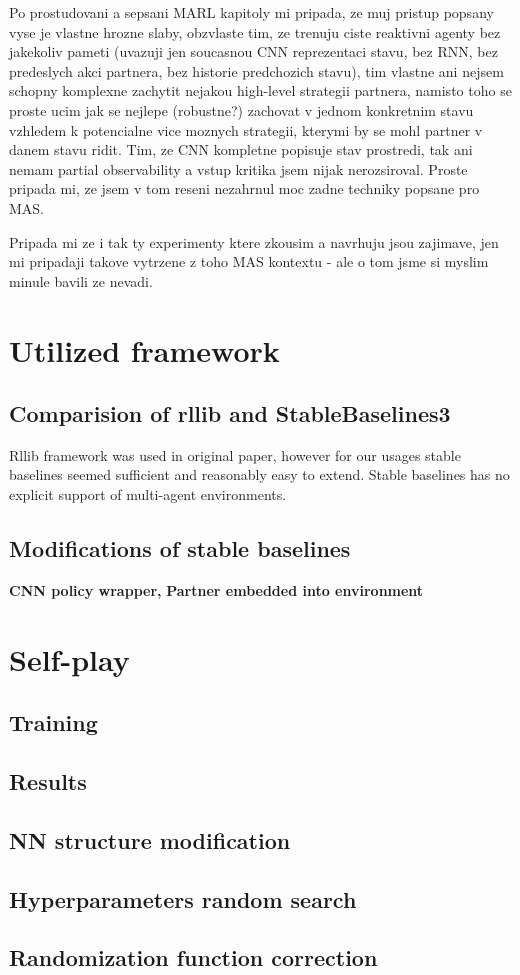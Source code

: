 {\color{blue} Po prostudovani a sepsani MARL kapitoly mi pripada, ze muj pristup popsany vyse je vlastne hrozne slaby, obzvlaste tim, ze trenuju ciste reaktivni agenty bez jakekoliv pameti (uvazuji jen soucasnou CNN reprezentaci stavu, bez RNN, bez predeslych akci partnera, bez historie predchozich stavu),
tim vlastne ani nejsem schopny komplexne zachytit nejakou high-level strategii partnera, namisto toho se proste ucim jak se nejlepe (robustne?) zachovat v jednom konkretnim stavu vzhledem k potencialne vice moznych strategii, kterymi by se mohl partner v danem stavu ridit.
Tim, ze CNN kompletne popisuje stav prostredi, tak ani nemam partial observability a vstup kritika jsem nijak nerozsiroval.
Proste pripada mi, ze jsem v tom reseni nezahrnul moc zadne techniky popsane pro MAS.

Pripada mi ze i tak ty experimenty ktere zkousim a navrhuju jsou zajimave, jen mi pripadaji takove vytrzene z toho MAS kontextu - ale o tom jsme si myslim minule bavili ze nevadi.
}

\section{Utilized framework}
\subsection*{Comparision of rllib and StableBaselines3}
Rllib framework was used in original paper, however for our usages stable baselines seemed sufficient and reasonably easy to extend.
Stable baselines has no explicit support of multi-agent environments.
\subsection{Modifications of stable baselines}
\par
\textbf{CNN policy wrapper,}
\textbf{Partner embedded into environment}

\section{Self-play}
\subsection{Training}
\subsection{Results}

\subsection{NN structure modification}

\subsection{Hyperparameters random search}

\subsection{Randomization function correction}





